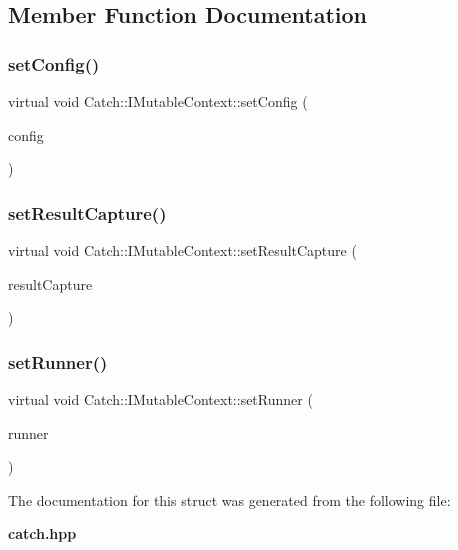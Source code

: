\subsection{Member Function Documentation}
\mbox{\label{struct_catch_1_1_i_mutable_context_a013e8f688a8ea7970262d07ead542a63}} 
\subsubsection{set\+Config()}
{\footnotesize\ttfamily virtual void Catch\+::\+I\+Mutable\+Context\+::set\+Config (\begin{DoxyParamCaption}\item[{\textbf{ Ptr}$<$ I\+Config const $>$ const \&}]{config }\end{DoxyParamCaption})\hspace{0.3cm}{\ttfamily [pure virtual]}}

\mbox{\label{struct_catch_1_1_i_mutable_context_a4a80afd0525b7def21bee8d9b48f2d39}} 
\subsubsection{set\+Result\+Capture()}
{\footnotesize\ttfamily virtual void Catch\+::\+I\+Mutable\+Context\+::set\+Result\+Capture (\begin{DoxyParamCaption}\item[{\textbf{ I\+Result\+Capture} $\ast$}]{result\+Capture }\end{DoxyParamCaption})\hspace{0.3cm}{\ttfamily [pure virtual]}}

\mbox{\label{struct_catch_1_1_i_mutable_context_af2e53b1dea4527a2587cff266a730f6e}} 
\subsubsection{set\+Runner()}
{\footnotesize\ttfamily virtual void Catch\+::\+I\+Mutable\+Context\+::set\+Runner (\begin{DoxyParamCaption}\item[{\textbf{ I\+Runner} $\ast$}]{runner }\end{DoxyParamCaption})\hspace{0.3cm}{\ttfamily [pure virtual]}}



The documentation for this struct was generated from the following file\+:\begin{DoxyCompactItemize}
\item 
\textbf{ catch.\+hpp}\end{DoxyCompactItemize}
